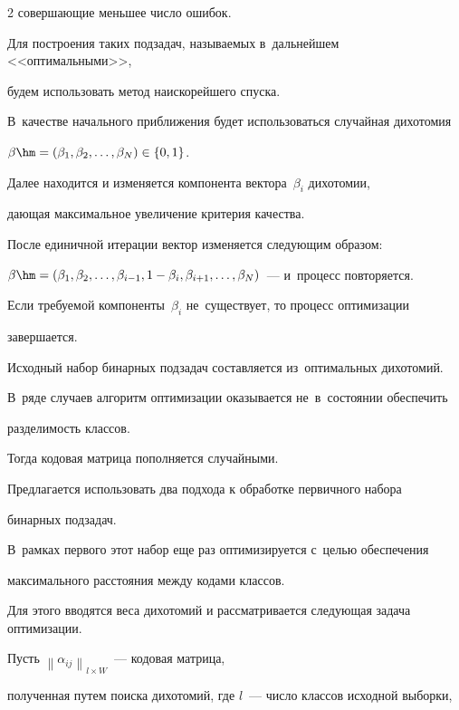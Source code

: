 \begin{multicols}{2}
совершающие меньшее число ошибок.





Для построения таких подзадач, называемых в~дальнейшем <<оптимальными>>, 


будем использовать метод наискорейшего спуска.


В~качестве начального приближения будет использоваться случайная дихотомия 


$\beta \hm=(\beta _{1} ,\beta _{2} ,\ldots,\beta _{N} )\in \{ 0,1\}$.\linebreak


Далее находится и изменяется компонента век\-тора~$\beta _{i}$ дихотомии, 


дающая максимальное увеличение критерия качества.


После единичной итерации вектор изменяется следующим образом:\linebreak 


$\beta \hm=(\beta_{1},\beta_{2},\ldots,\beta_{i-1}, 1-\beta_{i},


\beta_{i+1},\ldots,\beta_{N})$~--- и~процесс повторяется.


Если требуемой компоненты~$\beta_{i}$ не~существует, то процесс оптимизации 


заверша\-ется.





Исходный набор бинарных подзадач составляется из~оптимальных дихотомий.


В~ряде случаев алгоритм оптимизации оказывается не~в~состоянии обеспечить 


разделимость классов.


Тогда кодовая матрица пополняется случайными.





Предлагается использовать два подхода к обработке первичного набора


 бинарных подзадач.


В~рамках первого этот набор еще раз оптимизируется с~целью обеспечения 


максимального расстояния между кодами классов.


Для этого вводятся веса дихотомий и рассматривается следующая задача оптимизации.


Пусть ${\left\| \alpha _{ij} \right\|_{l \times W}}$~--- кодовая матрица, 


полученная путем поиска дихотомий, где $l$~--- число классов исходной выборки, 



\end{multicols}
